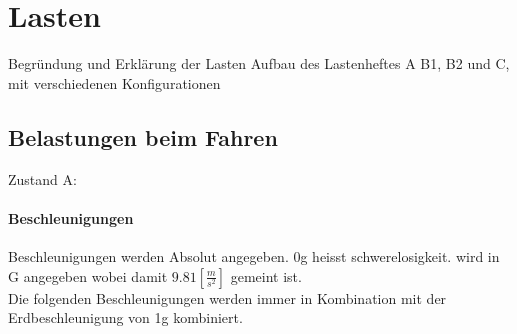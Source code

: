 \section{Lasten}
Begründung und Erklärung der Lasten
Aufbau des Lastenheftes A B1, B2 und C, mit verschiedenen Konfigurationen

\subsection{Belastungen beim Fahren}
Zustand A:


\paragraph{Beschleunigungen}\vfill
Beschleunigungen werden Absolut angegeben. 0g heisst schwerelosigkeit. wird in G angegeben wobei damit $9.81 \left[\frac{m}{s^2}\right]$ gemeint ist.\\

Die folgenden Beschleunigungen werden immer in Kombination mit der Erdbeschleunigung von 1g kombiniert.


